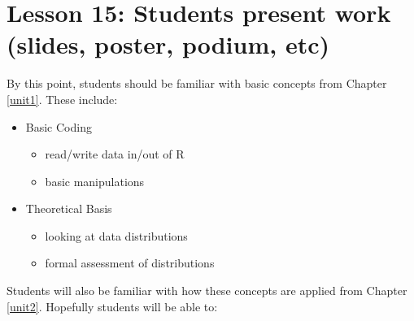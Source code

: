 \documentclass[
]{book}
\providecommand{\tightlist}{%
  \setlength{\itemsep}{0pt}\setlength{\parskip}{0pt}}
\begin{document}
\hypertarget{lesson-15-students-present-work-slides-poster-podium-etc}{%
\section*{Lesson 15: Students present work (slides, poster, podium, etc)}\label{lesson-15-students-present-work-slides-poster-podium-etc}}

By this point, students should be familiar with basic concepts from Chapter \ref{unit1}. These include:

\begin{itemize}
\tightlist
\item
  Basic Coding

  \begin{itemize}
  \tightlist
  \item
    read/write data in/out of R
  \item
    basic manipulations
  \end{itemize}
\item
  Theoretical Basis

  \begin{itemize}
  \tightlist
  \item
    looking at data distributions
  \item
    formal assessment of distributions
  \end{itemize}
\end{itemize}

Students will also be familiar with how these concepts are applied from Chapter \ref{unit2}. Hopefully students will be able to:
\end{document}
